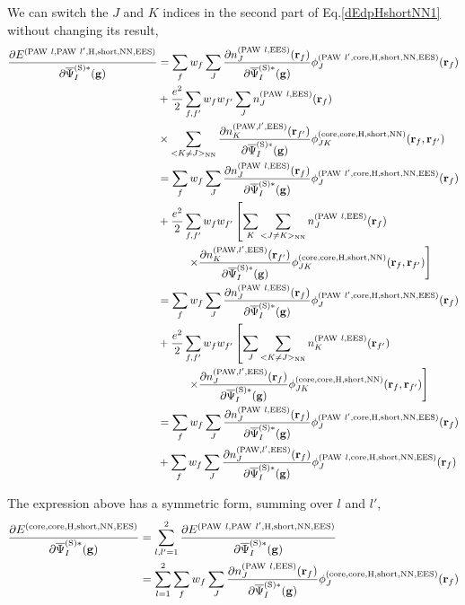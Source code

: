 \documentclass[paper=a4, fontsize=11pt]{article} %
\numberwithin{equation}{section} %
\numberwithin{figure}{section} %
\numberwithin{table}{section} %
\newcommand{\p}{\partial}
\newcommand{\bg}{{\bf{g}}}
\newcommand{\br}{{\bf{r}}}
\newcommand{\rS}{{\mathrm{S}}}
\newcommand{\rEES}{{\mathrm{EES}}}
\newcommand{\rcore}{{\mathrm{core}}}
\newcommand{\rNN}{{\mathrm{NN}}}
\newcommand{\rshort}{{\mathrm{short}}}
\newcommand{\rP}{{\mathrm{PAW}}}
\newcommand{\rH}{{\mathrm{H}}}
\newcommand{\psigsc}{{\overline \Psi_I^{(\rS)*}(\bg)}}
\begin{document}
We can switch the $J$ and $K$ indices in the second part of Eq.\eqref{dEdpHshortNN1} without changing its result,
\begin{equation}\label{dEdpHshortNN2}
\begin{split}
\frac{\p E^{(\rP\ l,\rP\ l',\rH,\rshort,\rNN,\rEES)}}{\p \psigsc}
&= \sum_{f} w_f \sum_J \frac{\p n_J^{(\rP\ l,\rEES)}(\br_f)}{\p \psigsc}\phi_J^{(\rP\ l',\rcore,\rH,\rshort,\rNN,\rEES)}(\br_f)\\
&+ \frac{e^2}{2}\sum_{f,f'} w_f w_{f'} \sum_J n_J^{(\rP\ l,\rEES)}(\br_f)\\
&\times \sum_{<K \neq J>_\rNN}\frac{\p n_K^{(\rP,l',\rEES)}(\br_{f'})}{\p \psigsc} \phi_{JK}^{(\rcore,\rcore,\rH,\rshort,\rNN)}(\br_f,\br_{f'}) \\ 
&=\sum_{f} w_f \sum_J \frac{\p n_J^{(\rP\ l,\rEES)}(\br_f)}{\p \psigsc}\phi_J^{(\rP\ l',\rcore,\rH,\rshort,\rNN,\rEES)}(\br_f)\\
&+ \frac{e^2}{2}\sum_{f,f'} w_f w_{f'} \left[\sum_K \sum_{<J \neq K>_\rNN} n_J^{(\rP\ l,\rEES)}(\br_f) \right. \\
&\left. \ \ \ \ \ \ \ \ \times \frac{\p n_K^{(\rP,l',\rEES)}(\br_{f'})}{\p \psigsc} \phi_{JK}^{(\rcore,\rcore,\rH,\rshort,\rNN)}(\br_f,\br_{f'}) \right]\\ 
&= \sum_{f} w_f \sum_J \frac{\p n_J^{(\rP\ l,\rEES)}(\br_f)}{\p \psigsc}\phi_J^{(\rP\ l',\rcore,\rH,\rshort,\rNN,\rEES)}(\br_f)\\
&+ \frac{e^2}{2}\sum_{f,f'} w_f w_{f'} \left[\sum_J \sum_{<K \neq J>_\rNN} n_K^{(\rP\ l,\rEES)}(\br_{f'}) \right. \\
&\left. \ \ \ \ \ \ \ \ \times \frac{\p n_J^{(\rP,l',\rEES)}(\br_{f})}{\p \psigsc} \phi_{JK}^{(\rcore,\rcore,\rH,\rshort,\rNN)}(\br_f,\br_{f'}) \right]\\ 
&= \sum_{f} w_f \sum_J \frac{\p n_J^{(\rP\ l,\rEES)}(\br_f)}{\p \psigsc}\phi_J^{(\rP\ l',\rcore,\rH,\rshort,\rNN,\rEES)}(\br_f)\\
&+ \sum_{f} w_f \sum_J \frac{\p n_J^{(\rP,l',\rEES)}(\br_f)}{\p \psigsc}\phi_J^{(\rP\ l,\rcore,\rH,\rshort,\rNN,\rEES)}(\br_f)\\
\end{split}
\end{equation}

The expression above has a symmetric form, summing over $l$ and $l'$,
\begin{equation} \label{eq:dHccNNdp}
\begin{split}
\frac{\p E^{(\rcore,\rcore,\rH,\rshort,\rNN,\rEES)}} {\p \psigsc}
&= \sum_{l,l'= 1}^2 \frac{\p E^{(\rP\ l,\rP\ l',\rH,\rshort,\rNN,\rEES)}}{\p \psigsc}\\
&= \sum_{l=1}^2 \sum_{f} w_f \sum_J \frac{\p n_J^{(\rP\ l,\rEES)}(\br_f)}{\p \psigsc}\phi_J^{(\rcore,\rcore,\rH,\rshort,\rNN,\rEES)}(\br_f)\\
\end{split}
\end{equation}
\end{document}
